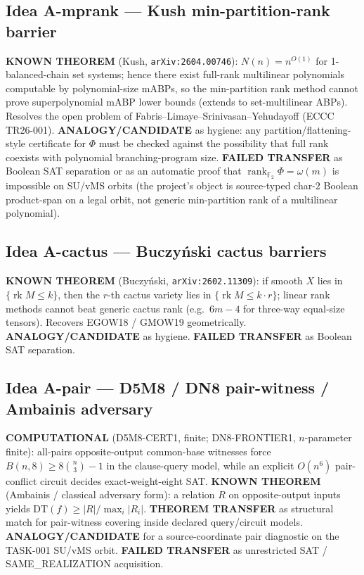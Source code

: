\documentclass[11pt]{article}
\begin{document}
\subsection*{Idea A-mprank --- Kush min-partition-rank barrier}
\textbf{KNOWN THEOREM} (Kush, \texttt{arXiv:2604.00746}): $N(n)=n^{O(1)}$ for
1-balanced-chain set systems; hence there exist full-rank multilinear polynomials
computable by polynomial-size mABPs, so the min-partition rank method cannot prove
superpolynomial mABP lower bounds (extends to set-multilinear ABPs). Resolves the
open problem of Fabris--Limaye--Srinivasan--Yehudayoff (ECCC TR26-001).
\textbf{ANALOGY/CANDIDATE} as hygiene: any partition/flattening-style certificate
for $\Phi$ must be checked against the possibility that full rank coexists with
polynomial branching-program size.
\textbf{FAILED TRANSFER} as Boolean SAT separation or as an automatic proof that
$\operatorname{rank}_{\mathbb F_2}\Phi=\omega(m)$ is impossible on SU/vMS orbits
(the project's object is source-typed char-$2$ Boolean product-span on a legal
orbit, not generic min-partition rank of a multilinear polynomial).

\subsection*{Idea A-cactus --- Buczy\'nski cactus barriers}
\textbf{KNOWN THEOREM} (Buczy\'nski, \texttt{arXiv:2602.11309}): if smooth $X$
lies in $\{\operatorname{rk} M\le k\}$, then the $r$-th cactus variety lies in
$\{\operatorname{rk} M\le k\cdot r\}$; linear rank methods cannot beat generic
cactus rank (e.g.\ $6m-4$ for three-way equal-size tensors). Recovers EGOW18 /
GMOW19 geometrically.
\textbf{ANALOGY/CANDIDATE} as hygiene. \textbf{FAILED TRANSFER} as Boolean SAT
separation.

\subsection*{Idea A-pair --- D5M8 / DN8 pair-witness / Ambainis adversary}
\textbf{COMPUTATIONAL} (D5M8-CERT1, finite; DN8-FRONTIER1, $n$-parameter finite):
all-pairs opposite-output common-base witnesses force
$B(n,8)\ge 8\binom{n}{3}-1$ in the clause-query model, while an explicit
$O(n^6)$ pair-conflict circuit decides exact-weight-eight SAT.
\textbf{KNOWN THEOREM} (Ambainis / classical adversary form): a relation $R$ on
opposite-output inputs yields
$\mathrm{DT}(f)\ge |R|/\max_i|R_i|$.
\textbf{THEOREM TRANSFER} as structural match for pair-witness covering inside
declared query/circuit models.
\textbf{ANALOGY/CANDIDATE} for a source-coordinate pair diagnostic on the
TASK-001 SU/vMS orbit.
\textbf{FAILED TRANSFER} as unrestricted SAT / SAME\_REALIZATION acquisition.
\end{document}
